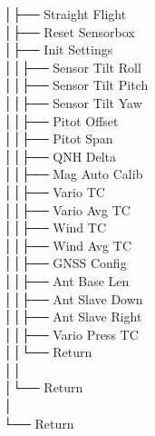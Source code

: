 │\hspace{2em}├── Straight Flight \\
│\hspace{2em}├── Reset Sensorbox \\
│\hspace{2em}├── Init Settings \\
│\hspace{2em}│\hspace{2em}├── Sensor Tilt Roll \\
│\hspace{2em}│\hspace{2em}├── Sensor Tilt Pitch \\
│\hspace{2em}│\hspace{2em}├── Sensor Tilt Yaw \\
│\hspace{2em}│\hspace{2em}├── Pitot Offset \\
│\hspace{2em}│\hspace{2em}├── Pitot Span \\
│\hspace{2em}│\hspace{2em}├── QNH Delta \\
│\hspace{2em}│\hspace{2em}├── Mag Auto Calib \\
│\hspace{2em}│\hspace{2em}├── Vario TC \\
│\hspace{2em}│\hspace{2em}├── Vario Avg TC \\
│\hspace{2em}│\hspace{2em}├── Wind TC \\
│\hspace{2em}│\hspace{2em}├── Wind Avg TC \\
│\hspace{2em}│\hspace{2em}├── GNSS Config \\
│\hspace{2em}│\hspace{2em}├── Ant Base Len \\
│\hspace{2em}│\hspace{2em}├── Ant Slave Down \\
│\hspace{2em}│\hspace{2em}├── Ant Slave Right \\
│\hspace{2em}│\hspace{2em}├── Vario Press TC \\
│\hspace{2em}│\hspace{2em}└── Return \\
│\hspace{2em}│\hspace{2em} \\
│\hspace{2em}└── Return \\
│\hspace{2em} \\
└── Return \\
\sffamily
\newpage